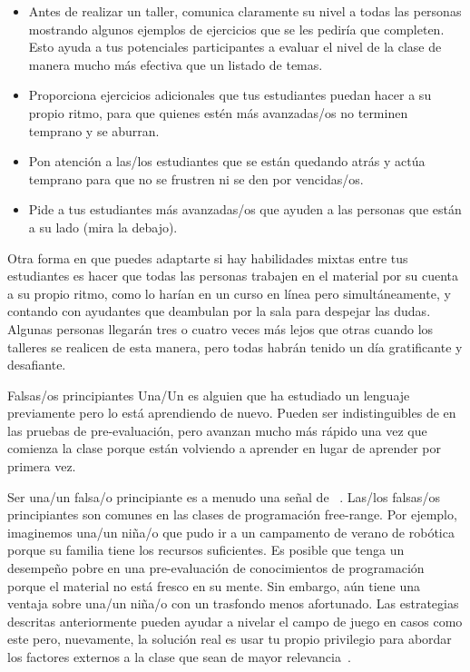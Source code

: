 \begin{itemize}

\item
  Antes de realizar un taller,
  comunica claramente su nivel a todas las personas mostrando algunos ejemplos de ejercicios que se les pediría que completen.
  Esto ayuda a tus potenciales participantes a evaluar el nivel de la clase
  de manera mucho más efectiva que un listado de temas.
  
\item
  Proporciona ejercicios adicionales que tus estudiantes puedan hacer a su propio ritmo,
  para que quienes estén más avanzadas/os no terminen temprano y se aburran.

\item
  Pon atención a las/los estudiantes que se están quedando atrás
  y actúa temprano para que no se frustren ni se den por vencidas/os.

\item
  Pide a tus estudiantes más avanzadas/os que ayuden a las personas que están a su lado
  (mira la  debajo).

\end{itemize}

Otra forma en que puedes adaptarte si hay habilidades mixtas entre tus estudiantes es
hacer que todas las personas trabajen en el material por su cuenta a su propio ritmo,
como lo harían en un curso en línea pero simultáneamente,
y contando con ayudantes que deambulan por la sala para despejar las dudas.
Algunas personas llegarán tres o cuatro veces más lejos que otras cuando los talleres se realicen de esta manera,
pero todas habrán tenido un día gratificante y desafiante.

\begin{aside}{Falsas/os principiantes}
  Una/Un  es alguien
  que ha estudiado un lenguaje previamente pero lo está aprendiendo de nuevo.
  Pueden ser indistinguibles de 
  en las pruebas de pre-evaluación,
  pero avanzan mucho más rápido una vez que comienza la clase
  porque están volviendo a aprender en lugar de aprender por primera vez.
 
  Ser una/un falsa/o principiante es a menudo una señal de ~\cite{Marg2010}.
  Las/los falsas/os principiantes son comunes en las clases de programación free-range.
  Por ejemplo, imaginemos
  una/un niña/o que pudo ir a un campamento de verano de robótica porque su familia tiene los recursos suficientes. Es posible que tenga
  un desempeño pobre en una pre-evaluación de conocimientos de programación
  porque el material no está fresco en su mente. Sin embargo,
  aún tiene una ventaja sobre una/un niña/o con un trasfondo menos afortunado.
  Las estrategias descritas anteriormente pueden ayudar a nivelar el campo de juego en casos como este
  pero, nuevamente, la solución real es usar tu propio privilegio
  para abordar los factores externos a la clase que sean de mayor relevancia~\cite{Part2011}.
\end{aside}

